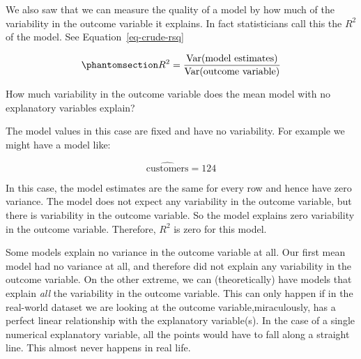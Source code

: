 \documentclass[
  12pt,
  letterpaper,
  DIV=11,
  numbers=noendperiod]{scrreprt}
\begin{document}
We also saw that we can measure the quality of a model by how much of
the variability in the outcome variable it explains. In fact
statisticians call this the \(R^2\) of the model. See
Equation~\ref{eq-crude-rsq}

\begin{equation}\phantomsection\label{eq-crude-rsq}{
R^2
=
\frac{\text{Var}(\text{model estimates})}
     {\text{Var}(\text{outcome variable})}
}\end{equation}

\begin{tcolorbox}[enhanced jigsaw, colback=white, leftrule=.75mm, toprule=.15mm, bottomtitle=1mm, breakable, coltitle=black, toptitle=1mm, title={Quick Check}, opacitybacktitle=0.6, colbacktitle=quarto-callout-note-color!10!white, arc=.35mm, left=2mm, colframe=quarto-callout-note-color-frame, titlerule=0mm, rightrule=.15mm, bottomrule=.15mm, opacityback=0]

How much variability in the outcome variable does the mean model with no
explanatory variables explain?

\end{tcolorbox}

\begin{tcolorbox}[enhanced jigsaw, colback=white, leftrule=.75mm, toprule=.15mm, bottomtitle=1mm, breakable, coltitle=black, toptitle=1mm, title={Suggested answer}, opacitybacktitle=0.6, colbacktitle=quarto-callout-note-color!10!white, arc=.35mm, left=2mm, colframe=quarto-callout-note-color-frame, titlerule=0mm, rightrule=.15mm, bottomrule=.15mm, opacityback=0]

The model values in this case are fixed and have no variability. For
example we might have a model like:

\[
\widehat{\text{customers}} = 124
\]

In this case, the model estimates are the same for every row and hence
have zero variance. The model does not expect any variability in the
outcome variable, but there is variability in the outcome variable. So
the model explains zero variability in the outcome variable. Therefore,
\(R^2\) is zero for this model.

\end{tcolorbox}

Some models explain no variance in the outcome variable at all. Our
first mean model had no variance at all, and therefore did not explain
any variability in the outcome variable. On the other extreme, we can
(theoretically) have models that explain \emph{all} the variability in
the outcome variable. This can only happen if in the real-world dataset
we are looking at the outcome variable,miraculously, has a perfect
linear relationship with the explanatory variable(s). In the case of a
single numerical explanatory variable, all the points would have to fall
along a straight line. This almost never happens in real life.
\end{document}
